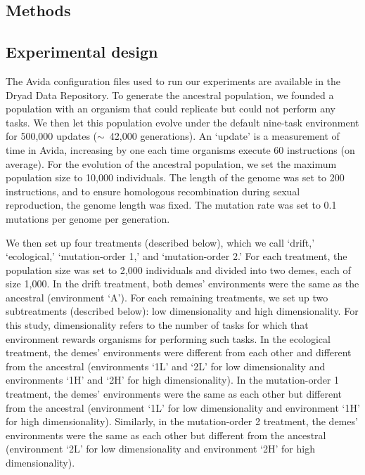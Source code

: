 \begin{doublespace}
\section{Methods}

\subsection{Experimental design}

The Avida configuration files used to run our experiments
are available in the Dryad Data Repository.
%
To generate the ancestral population,
we founded a population with an organism that could replicate
but could not perform any tasks.
%
We then let this population evolve under the default nine-task environment
for 500,000 updates ($\sim$~42,000 generations).
%
An `update' is a measurement of time in Avida, increasing by one each time
organisms execute 60 instructions (on average).
%
For the evolution of the ancestral population,
we set the maximum population size to 10,000 individuals.
%
The length of the genome was set to 200 instructions,
and to ensure homologous recombination
during sexual reproduction, the genome length was fixed.
%
The mutation rate was set to 0.1 mutations per genome per generation.



We then set up four treatments (described below), which we call
`drift,' `ecological,' `mu\-ta\-tion-or\-der 1,' and `mu\-ta\-tion-or\-der 2.'
%
For each treatment,
the population size was set to 2,000 individuals
and divided into two demes, each of size 1,000.
%
In the drift treatment, both demes' environments
were the same as the ancestral (environment `A').
%
For each remaining treatments,
we set up two subtreatments (described below):
low dimensionality and high dimensionality.
%
For this study, dimensionality refers to the number of tasks
for which that environment rewards organisms for performing such tasks.
%
In the ecological treatment, the demes' environments
were different from each other and different from the ancestral
(environments `1L' and `2L' for low dimensionality
and environments `1H' and `2H' for high dimensionality).
%
In the mutation-order 1 treatment,
the demes' environments were the same as each other
but different from the ancestral
(environment `1L' for low dimensionality
and environment `1H' for high dimensionality).
%
Similarly, in the mutation-order 2 treatment,
the demes' environments were the same as each other
but different from the ancestral
(environment `2L' for low dimensionality
and environment `2H' for high dimensionality).




\end{doublespace}
